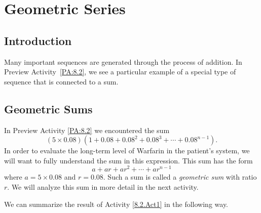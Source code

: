 \section{Geometric Series} \label{S:8.2.Geometric}

\vspace*{-14 pt}

\subsection*{Introduction}

Many important sequences are generated through the process of addition.  In Preview Activity~\ref{PA:8.2}, we see a particular example of a special type of sequence that is connected to a sum.



\subsection*{Geometric Sums}

In Preview Activity \ref{PA:8.2} we encountered the sum
\[(5 \times 0.08)\left(1+0.08+0.08^2+0.08^3+ \cdots + 0.08^{n-1}\right).\]
In order to evaluate the long-term level of Warfarin in the patient's system, we will want to fully understand the sum in this expression. This sum has the form
\begin{equation} \label{eq:8.2_part_sum_geometric_1}
a+ar+ar^2+ \cdots + ar^{n-1}
\end{equation}
where $a=5 \times 0.08$ and $r=0.08$. Such a sum is called a \emph{geometric sum} with ratio $r$. We will analyze this sum in more detail in the next activity.



We can summarize the result of Activity \ref{8.2.Act1} in the following way.

